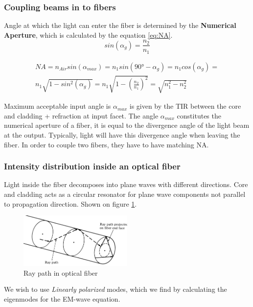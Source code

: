 \subsubsection{Coupling beams in to fibers}

Angle at which the light can enter the fiber is determined by the \textbf{Numerical Aperture}, which is calculated by the equation \ref{eq:NA}.
\begin{equation}
    sin(\alpha_g) = \frac{n_2}{n_1}
\end{equation}

\begin{multline}
    NA = n_{Air} sin(\alpha_{max}) = n_1 sin(90° - \alpha_g) = n_1 cos(\alpha_g) =\\
     n_1 \sqrt{1 - sin^2(\alpha_g)} = n_1 \sqrt{1 - (\frac{n_2}{n_1})^2} = \sqrt{n_1^2 - n_2^2}
\label{eq:NA}
\end{multline}

Maximum acceptable input angle is $\alpha_{max}$ is given by the TIR between the core and cladding + refraction at input facet. 
The angle $\alpha_{max}$ constitutes the numerical aperture of a fiber, it is equal to the divergence angle of the light beam at the output. 
Typically, light will have this divergence angle when leaving the fiber. In order to couple two fibers, they have to have matching NA.

\subsubsection{Intensity distribution inside an optical fiber}

Light inside the fiber decomposes into plane waves with different directions.
Core and cladding acts as a circular resonator for plane wave components not parallel
to propagation direction. Shown on figure \ref{fig:opi}.

\begin{figure}[h!]
    \centering
    \includegraphics[width=0.5\textwidth]{slike/rof.png}
    \caption{Ray path in optical fiber}
    \label{fig:opi}
\end{figure}


We wish to use \textit{Linearly polarized} modes, which we find by calculating the eigenmodes for the EM-wave equation.

